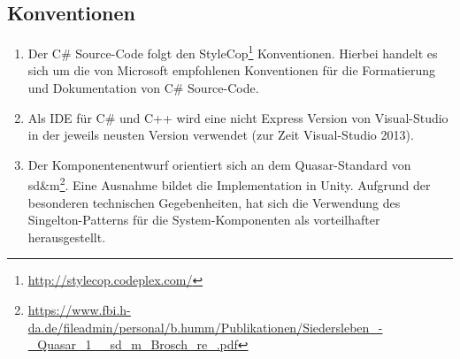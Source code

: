 \subsection{Konventionen}

\begin{enumerate}
	\item Der C\# Source-Code folgt den StyleCop\footnote{\url{http://stylecop.codeplex.com/}} Konventionen. Hierbei handelt es sich um die von Microsoft empfohlenen Konventionen für die Formatierung und Dokumentation von C\# Source-Code.
	\item Als IDE für C\# und C++ wird eine nicht Express Version von Visual-Studio in der jeweils neusten Version verwendet (zur Zeit Visual-Studio 2013).
	\item Der Komponentenentwurf orientiert sich an dem Quasar-Standard von sd\&m\footnote{\url{https://www.fbi.h-da.de/fileadmin/personal/b.humm/Publikationen/Siedersleben\_-\_Quasar\_1\_\_sd\_m\_Brosch\_re\_.pdf}}. Eine Ausnahme bildet die Implementation in Unity. Aufgrund der besonderen technischen Gegebenheiten, hat sich die Verwendung des Singelton-Patterns für die System-Komponenten als vorteilhafter herausgestellt.
\end{enumerate}